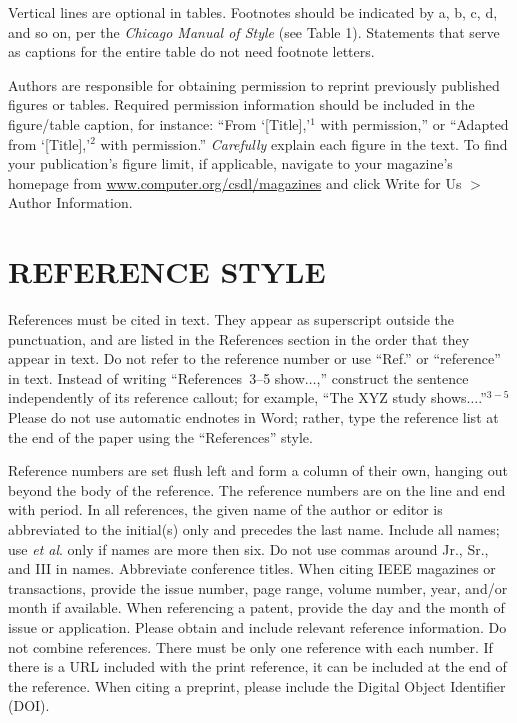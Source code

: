 \documentclass{IEEEcsmag}
\begin{document}
Vertical lines are optional in tables. Footnotes should be indicated by a, b, c, d, and so on, per the \emph{Chicago Manual of Style} (see Table 1). Statements that serve as captions for the entire table do not need footnote letters. 

Authors are responsible for obtaining permission to reprint previously published figures or tables. Required permission information should be included in the figure/table caption, for instance: ``From `[Title],'$^1$ with permission,'' or ``Adapted from `[Title],'$^2$ with permission.'' \emph{Carefully} explain each figure in the text. To find your publication's figure limit, if applicable, navigate to your magazine's homepage from \href{https://www.computer.org/csdl/magazines}{www.computer.org/csdl/magazines} and click Write for Us $>$ Author Information.




\section{REFERENCE STYLE}
References must be cited in text. They appear as superscript outside the punctuation, and are listed in the References section in the order that they appear in text. Do not refer to the reference number or use ``Ref.'' or ``reference'' in text. Instead of writing ``References~3--5 show$\ldots$,'' construct the sentence independently of its reference callout; for example, ``The XYZ study shows$\ldots$.''$^{3-5}$ Please do not use automatic endnotes in Word; rather, type the reference list at the end of the paper using the ``References'' style.

Reference numbers are set flush left and form a column of their own, hanging out beyond the body of the reference. The reference numbers are on the line and end with period. In all references, the given name of the author or editor is abbreviated to the initial(s) only and precedes the last name. Include all names; use \emph{et al}. only if names are more then six. Do not use commas around Jr., Sr., and III in names. Abbreviate conference titles. When citing IEEE magazines or transactions, provide the issue number, page range, volume number, year, and/or month if available. When referencing a patent, provide the day and the month of issue or application. Please obtain and include relevant reference information. Do not combine references. There must be only one reference with each number. If there is a URL included with the print reference, it can be included at the end of the reference. When citing a preprint, please include the Digital Object Identifier (DOI).
\end{document}
